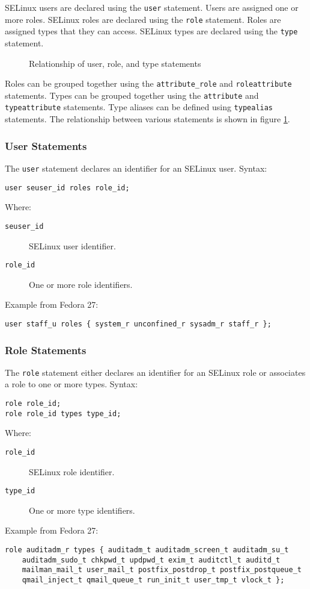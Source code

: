 SELinux users are declared using the \texttt{user} statement. Users are assigned
one or more roles. SELinux roles are declared using the \texttt{role} statement.
Roles are assigned types that they can access. SELinux types are declared using
the \texttt{type} statement.

\begin{figure}
    \centering
    \label{fig:userroletype}
    
    \caption{Relationship of user, role, and type statements}
\end{figure}

Roles can be grouped together using the \texttt{attribute\_role} and
\texttt{roleattribute} statements. Types can be grouped together using the
\texttt{attribute} and \texttt{typeattribute} statements. Type aliases can be
defined using \texttt{typealias} statements. The relationship between various
statements is shown in figure \ref{fig:userroletype}.

\subsubsection{User Statements}
The \texttt{user} statement declares an identifier for an SELinux user. Syntax:
\begin{lstlisting}[language=te]
user seuser_id roles role_id;
\end{lstlisting}
Where:
\begin{description}
    \item [\texttt{seuser\_id}] SELinux user identifier.
    \item [\texttt{role\_id}] One or more role identifiers.
\end{description}
Example from Fedora 27:
\begin{lstlisting}[language=te]
user staff_u roles { system_r unconfined_r sysadm_r staff_r };
\end{lstlisting}

\subsubsection{Role Statements}
The \texttt{role} statement either declares an identifier for an SELinux role or
associates a role to one or more types. Syntax:
\begin{lstlisting}[language=te]
role role_id;
role role_id types type_id;
\end{lstlisting}
Where:
\begin{description}
    \item [\texttt{role\_id}] SELinux role identifier.
    \item [\texttt{type\_id}] One or more type identifiers.
\end{description}
Example from Fedora 27:
\begin{lstlisting}[language=te]
role auditadm_r types { auditadm_t auditadm_screen_t auditadm_su_t
    auditadm_sudo_t chkpwd_t updpwd_t exim_t auditctl_t auditd_t
    mailman_mail_t user_mail_t postfix_postdrop_t postfix_postqueue_t
    qmail_inject_t qmail_queue_t run_init_t user_tmp_t vlock_t };
\end{lstlisting}

